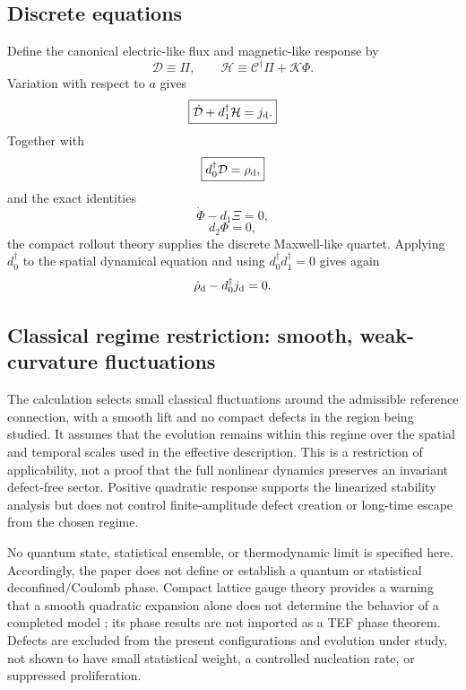 \documentclass[11pt]{article}
\begin{document}
\subsection{Discrete equations}

Define the canonical electric-like flux and magnetic-like response by
\begin{equation}
\boxed{
\mathcal D\equiv\Pi,
\qquad
\mathcal H\equiv
\mathcal C^\dagger\Pi+\mathcal K\Phi.
}
\end{equation}
Variation with respect to $a$ gives
\begin{equation}
\boxed{
\dot{\mathcal D}+d_1^\dagger\mathcal H=j_{\rm d}.
}
\end{equation}
Together with
\begin{equation}
\boxed{
d_0^\dagger\mathcal D=\rho_{\rm d},
}
\end{equation}
and the exact identities
\begin{equation}
\boxed{
\dot\Phi-d_1\Xi=0,
}
\end{equation}
\begin{equation}
\boxed{
d_2\Phi=0,
}
\end{equation}
the compact rollout theory supplies the discrete Maxwell-like quartet. Applying $d_0^\dagger$ to the spatial dynamical equation and using $d_0^\dagger d_1^\dagger=0$ gives again
\begin{equation}
\dot\rho_{\rm d}-d_0^\dagger j_{\rm d}=0.
\end{equation}

\subsection{Classical regime restriction: smooth, weak-curvature fluctuations}
\label{sec:classicalregime}

The calculation selects small classical fluctuations around the admissible reference connection, with a smooth lift and no compact defects in the region being studied. It assumes that the evolution remains within this regime over the spatial and temporal scales used in the effective description. This is a restriction of applicability, not a proof that the full nonlinear dynamics preserves an invariant defect-free sector. Positive quadratic response supports the linearized stability analysis but does not control finite-amplitude defect creation or long-time escape from the chosen regime.

No quantum state, statistical ensemble, or thermodynamic limit is specified here. Accordingly, the paper does not define or establish a quantum or statistical deconfined/Coulomb phase. Compact lattice gauge theory provides a warning that a smooth quadratic expansion alone does not determine the behavior of a completed model \cite{kogut1979}; its phase results are not imported as a TEF phase theorem. Defects are excluded from the present configurations and evolution under study, not shown to have small statistical weight, a controlled nucleation rate, or suppressed proliferation.
\end{document}
